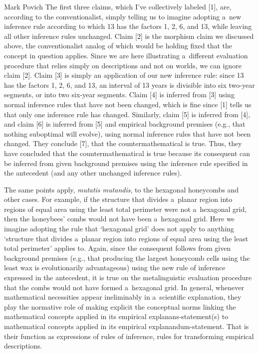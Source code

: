 \begin{artengenv}{Mark Povich}
{}
The first three claims, which I've collectively labeled [1], are, according to the conventionalist, simply telling us to imagine adopting a~new inference rule according to which 13 has the factors 1, 2, 6, and 13, while leaving all other inference rules unchanged. Claim [2] is the morphism claim we discussed above, the conventionalist analog of which would be holding fixed that the concept in question applies. Since we are here illustrating a~different evaluation procedure that relies simply on descriptions and not on worlds, we can ignore claim [2]. Claim [3] is simply an application of our new inference rule: since 13 has the factors 1, 2, 6, and 13, an interval of 13 years is divisible into six two-year segments, or into two six-year segments. Claim [4] is inferred from [3] using normal inference rules that have not been changed, which is fine since [1] tells us that only one inference rule has changed. Similarly, claim [5] is inferred from [4], and claim [6] is inferred from [5] and empirical background premises (e.g., that nothing suboptimal will evolve), using normal inference rules that have not been changed. They conclude [7], that the countermathematical is true. Thus, they have concluded that the countermathematical is true because its consequent can be inferred from given background premises using the inference rule specified in the antecedent (and any other unchanged inference rules).

The same points apply, \textit{mutatis mutandis}, to the hexagonal honeycombs and other cases. For example, if the structure that divides a~planar region into regions of equal area using the least total perimeter were not a~hexagonal grid, then the honeybees' combs would not have been a~hexagonal grid. Here we imagine adopting the rule that ‘hexagonal grid' does not apply to anything ‘structure that divides a~planar region into regions of equal area using the least total perimeter' applies to. Again, since the consequent follows from given background premises (e.g., that producing the largest honeycomb cells using the least wax is evolutionarily advantageous) using the new rule of inference expressed in the antecedent, it is true on the metalinguistic evaluation procedure that the combs would not have formed a~hexagonal grid. In general, whenever mathematical necessities appear ineliminably in a~scientific explanation, they play the normative role of making explicit the conceptual norms linking the mathematical concepts applied in its empirical explanans-statement(s) to mathematical concepts applied in its empirical explanandum-statement. That is their function as expressions of rules of inference, rules for transforming empirical descriptions.


\end{artengenv}
